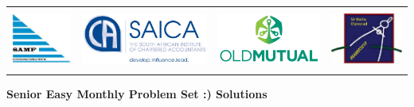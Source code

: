 \documentclass{article}
\begin{document}
\setlength{\tabcolsep}{6pt}
\begin{center} \begin{tabular}{cccc}
	\includegraphics[height=56pt]{SAMF_logo.jpg} &
	\includegraphics[height=56pt]{SAICA_logo.jpg} &
	\includegraphics[height=56pt]{OM_Logo_Stacked_Vignette_on_White_RGB.jpg} &
	\includegraphics[height=56pt]{SAMO2019.png}
\end{tabular} \end{center}


\bigskip


\begin{center}
	\textbf{\Large Senior Easy Monthly Problem Set :) Solutions}
\end{center}
\end{document}
